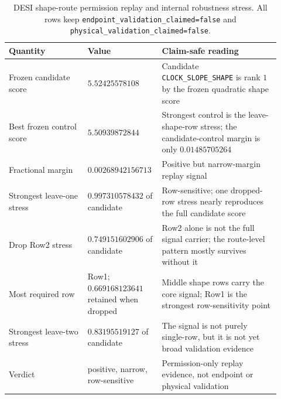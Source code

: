 \documentclass[11pt]{article}
\begin{document}
\begin{table}[t]
\centering
\caption{DESI shape-route permission replay and internal robustness stress.
All rows keep \texttt{endpoint\_\allowbreak{}validation\_\allowbreak{}claimed=false} and
\texttt{physical\_\allowbreak{}validation\_\allowbreak{}claimed=false}.}
\label{tab:desi-shape-route-robustness}
\footnotesize
\begin{tabular}{p{0.28\linewidth}p{0.22\linewidth}p{0.42\linewidth}}
\toprule
Quantity & Value & Claim-safe reading\\
\midrule
Frozen candidate score & \(5.52425578108\) & Candidate
\texttt{CLOCK\_\allowbreak{}SLOPE\_\allowbreak{}SHAPE} is rank \(1\) by the frozen quadratic shape
score\\
Best frozen control score & \(5.50939872844\) & Strongest control is the
leave-shape-row stress; the candidate-control margin is only
\(0.01485705264\)\\
Fractional margin & \(0.00268942156713\) & Positive but narrow-margin replay
signal\\
Strongest leave-one stress & \(0.997310578432\) of candidate & Row-sensitive;
one dropped-row stress nearly reproduces the full candidate score\\
Drop Row2 stress & \(0.749151602906\) of candidate & Row2 alone is not the
full signal carrier; the route-level pattern mostly survives without it\\
Most required row & Row1; \(0.669168123641\) retained when dropped & Middle
shape rows carry the core signal; Row1 is the strongest row-sensitivity point\\
Strongest leave-two stress & \(0.83195519127\) of candidate & The signal is not
purely single-row, but it is not yet broad validation evidence\\
Verdict & positive, narrow, row-sensitive & Permission-only replay evidence,
not endpoint or physical validation\\
\bottomrule
\end{tabular}
\end{table}
\end{document}
